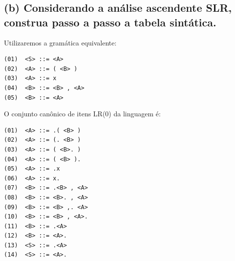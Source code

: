 \documentclass{article}
\begin{document}
\subsection{(b) Considerando a análise ascendente SLR, construa passo a passo a tabela sintática.}
Utilizaremos a gramática equivalente:
\begin{lstlisting}
(01)  <S> ::= <A>
(02)  <A> ::= ( <B> )
(03)  <A> ::= x
(04)  <B> ::= <B> , <A>
(05)  <B> ::= <A>
\end{lstlisting}

O conjunto canônico de itens LR(0) da linguagem é:
\begin{lstlisting}
(01)  <A> ::= .( <B> )
(02)  <A> ::= (. <B> )
(03)  <A> ::= ( <B>. )
(04)  <A> ::= ( <B> ).
(05)  <A> ::= .x
(06)  <A> ::= x.
(07)  <B> ::= .<B> , <A>
(08)  <B> ::= <B>. , <A>
(09)  <B> ::= <B> ,. <A>
(10)  <B> ::= <B> , <A>.
(11)  <B> ::= .<A>
(12)  <B> ::= <A>.
(13)  <S> ::= .<A>
(14)  <S> ::= <A>.
\end{lstlisting}
\end{document}
